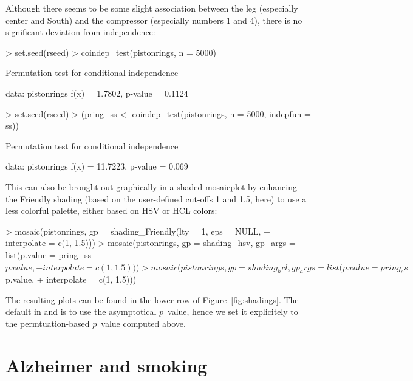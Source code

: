 \documentclass{Z}
\begin{document}
Although there seems to be some slight association between the leg (especially center and South)
and the compressor (especially numbers 1 and 4), there is no significant deviation from
independence:

\begin{Schunk}
\begin{Sinput}
> set.seed(rseed)
> coindep_test(pistonrings, n = 5000)
\end{Sinput}
\begin{Soutput}
	Permutation test for conditional independence

data:  pistonrings 
f(x) = 1.7802, p-value = 0.1124
\end{Soutput}
\begin{Sinput}
> set.seed(rseed)
> (pring_ss <- coindep_test(pistonrings, n = 5000, indepfun = ss))
\end{Sinput}
\begin{Soutput}
	Permutation test for conditional independence

data:  pistonrings 
f(x) = 11.7223, p-value = 0.069
\end{Soutput}
\end{Schunk}

This can also be brought out graphically in a shaded mosaicplot by enhancing the Friendly
shading (based on the user-defined cut-offs 1 and 1.5, here) to use a less colorful palette,
either based on HSV or HCL colors:

\begin{Schunk}
\begin{Sinput}
> mosaic(pistonrings, gp = shading_Friendly(lty = 1, eps = NULL, 
+     interpolate = c(1, 1.5)))
> mosaic(pistonrings, gp = shading_hsv, gp_args = list(p.value = pring_ss$p.value, 
+     interpolate = c(1, 1.5)))
> mosaic(pistonrings, gp = shading_hcl, gp_args = list(p.value = pring_ss$p.value, 
+     interpolate = c(1, 1.5)))
\end{Sinput}
\end{Schunk}

The resulting plots can be found in the lower row of Figure~\ref{fig:shadings}. The default
in  and  is to use the asymptotical $p$~value, hence
we set it explicitely to the permtuation-based $p$~value computed above.



\section{Alzheimer and smoking} \label{sec:alzheimer}
\end{document}
